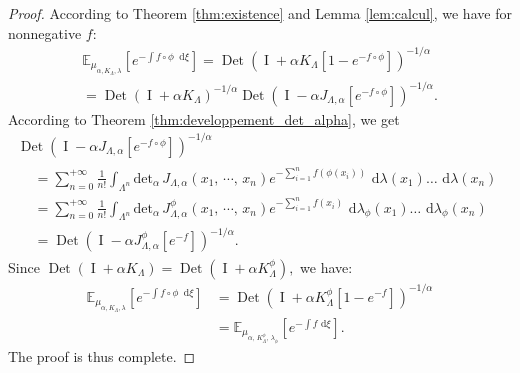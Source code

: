 \documentclass[11pt,a4paper]{amsart}
\begin{document}
\begin{proof}
  According to Theorem \ref{thm:existence} and Lemma \ref{lem:calcul},
  we have for nonnegative $f$:
  \begin{multline*}
    {{\mathbb E}}_{\mu_{\alpha,K_{\Lambda},\lambda}} \left[ e^{- \int{f\circ \phi
          \ {\text{ d}}\xi}} \right]=
    {\operatorname{Det}}\left( {\operatorname{I}}+\alpha K_{\Lambda}[1-e^{-f\circ \phi} ] \right)^{-1/\alpha}\\
    ={\operatorname{Det}}\left( {\operatorname{I}}+\alpha K_{\Lambda}\right)^{-1/\alpha} {\operatorname{Det}}\left(
      {\operatorname{I}}-\alpha J_{\Lambda,\alpha} [e^{-f\circ
        \phi}]\right)^{-1/\alpha}.
  \end{multline*}
  According to Theorem \ref{thm:developpement_det_alpha}, we get
  \begin{multline*}
    {\operatorname{Det}}\left( {\operatorname{I}}-\alpha J_{\Lambda,\alpha} [e^{-f\circ \phi}]\right)^{-1/\alpha}\\
    \begin{aligned}
      &{=\sum_{n=0}^{+\infty}\frac{1}{n!}
        \int_{\Lambda^n}{{{\text{det}}}_{\alpha}\, J_{\Lambda,\alpha}(x_1,\,
          \cdots,\, x_n)
          e^{-\sum_{i=1}^n f(\phi(x_i))}{\text{ d}}\lambda(x_1)\ldots {\text{ d}}\lambda(x_n)  }}\\
      
      
      &{=\sum_{n=0}^{+\infty}\frac{1}{n!}\int_{\Lambda^n}{{{\text{det}}}_{\alpha}\,
          J^{\phi}_{\Lambda,\alpha}(x_1,\, \cdots,\, x_n)e^{-\sum_{i=1}^nf(x_i)} {\text{ d}}\lambda_{\phi}(x_1)\ldots{\text{ d}}\lambda_{\phi}(x_n)  }}\\
      &{ ={\operatorname{Det}}\left( {\operatorname{I}}-\alpha J^{\phi}_{\Lambda,\alpha}
          [e^{-f}]\right)^{-1/\alpha}.}
    \end{aligned}
  \end{multline*}
  Since ${\operatorname{Det}}\left( {\operatorname{I}}+\alpha K_{\Lambda}\right) ={\operatorname{Det}}\left( {\operatorname{I}}+\alpha
    K_{\Lambda}^\phi\right) ,$ we have:
  \begin{align*}
    {{\mathbb E}}_{\mu_{\alpha,K_{\Lambda},\lambda}} \left[ e^{- \int{f\circ \phi
          \ {\text{ d}}\xi}}
    \right] &=  {\operatorname{Det}}\left( {\operatorname{I}}+\alpha K^{\phi}_{\Lambda}[1-e^{-f}] \right)^{-1/\alpha}\\
    &={{\mathbb E}}_{\mu_{\alpha,\, K_{\Lambda}^{\phi},\, \lambda_{\phi}}} \left[
      e^{- \int{f {\text{ d}}\xi}} \right].
  \end{align*}
  The proof is thus complete.
\end{proof}
\end{document}
